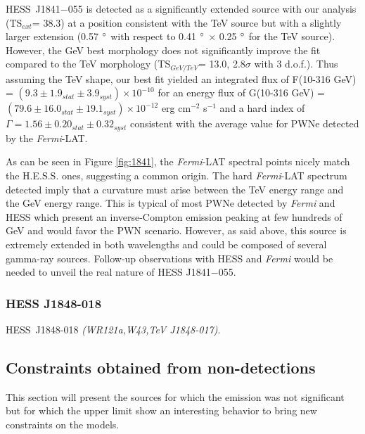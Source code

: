 HESS~J1841$-$055 is detected as a significantly extended source with our analysis (TS$_{ext}$= 38.3) at a position consistent with the TeV source but with a slightly larger extension (0.57 $\mbox{$^\circ$}$ with respect to 0.41 $\mbox{$^\circ$}$ $\times$ 0.25 $\mbox{$^\circ$}$ for the TeV source). However, the GeV best morphology does not significantly improve the fit compared to the TeV morphology (TS$_{GeV/TeV}$= 13.0, 2.8$\sigma$ with 3 d.o.f.). Thus assuming the TeV shape, our best fit yielded an integrated flux of F(10-316 GeV) = $(9.3 \pm 1.9_{stat} \pm 3.9_{syst}) \times 10^{-10}$ for an energy flux of G(10-316 GeV) = $(79.6 \pm 16.0_{stat} \pm 19.1_{syst}) \times 10^{-12}$ erg cm$^{-2}$ s$^{-1}$ and a hard index of $\Gamma = 1.56 \pm 0.20_{stat} \pm 0.32_{syst}$ consistent with the average value for PWNe detected by the \emph{Fermi}-LAT.

As can be seen in Figure \ref{fig:1841}, the \emph{Fermi}-LAT spectral points nicely match the H.E.S.S. ones, suggesting a common origin. The hard \emph{Fermi}-LAT spectrum detected imply that a curvature must arise between the TeV energy range and the GeV energy range. This is typical of most PWNe detected by \emph{Fermi} and HESS which present an inverse-Compton emission peaking at few hundreds of GeV and would favor the PWN scenario. However, as said above, this source is extremely extended in both wavelengths and could be composed of several gamma-ray sources. Follow-up observations with HESS and \emph{Fermi} would be needed to unveil the real nature of HESS J1841$-$055.


\subsubsection*{HESS J1848-018}

HESS~J1848-018 \emph{(WR121a,W43,TeV J1848-017)}.

\subsection{Constraints obtained from non-detections}

This section will present the sources for which the emission was not significant but for which the upper limit show an interesting behavior to bring new constraints on the models.

